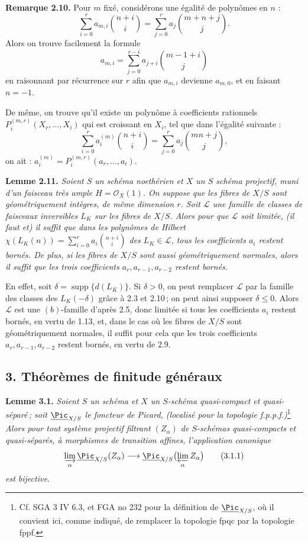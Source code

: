 \textbf{Remarque 2.10.} Pour \(m\) fixé, considérons une égalité de polynômes en \(n\) :
\[
\sum_{i=0}^{r}a_{m,i}\binom{n+i}{i}
=
\sum_{j=0}^{r}a_j\binom{m+n+j}{j}.
\]
Alors on trouve facilement la formule
\[
a_{m,i}=\sum_{j=0}^{r-i}a_{j+i}\binom{m-1+i}{j}
\]
en raisonnant par récurrence sur \(r\) afin que \(a_{m,i}\) devienne \(a_{m,0}\), et en faisant \(n=-1\).

De même, on trouve qu'il existe un polynôme à coefficients rationnels \(P_i^{(m,r)}(X_r,\ldots,X_i)\) qui est croissant en \(X_i\), tel que dans l'égalité suivante :
\[
\sum_{i=0}^{r}a_i^{(m)}\binom{n+i}{i}
=
\sum_{j=0}^{r}a_j\binom{mn+j}{j},
\]
on ait : \(a_i^{(m)}=P_i^{(m,r)}(a_r,\ldots,a_i)\).

\textbf{Lemme 2.11.} \emph{Soient \(S\) un schéma noethérien et \(X\) un \(S\) schéma projectif, muni d'un faisceau très ample \(H=\mathcal O_X(1)\). On suppose que les fibres de \(X/S\) sont géométriquement intègres, de même dimension \(r\). Soit \(\mathcal L\) une famille de classes de faisceaux inversibles \(L_K\) sur les fibres de \(X/S\). Alors pour que \(\mathcal L\) soit limitée, (il faut et) il suffit que dans les polynômes de Hilbert \(\chi(L_K(n))=\sum_{i=0}^{r}a_i\binom{n+i}{i}\) des \(L_K\in\mathcal L\), tous les coefficients \(a_i\) restent bornés. De plus, si les fibres de \(X/S\) sont aussi géométriquement normales, alors il suffit que les trois coefficients \(a_r,a_{r-1},a_{r-2}\) restent bornés.}

En effet, soit \(\delta=\operatorname{supp}\{d(L_K)\}\). Si \(\delta>0\), on peut remplacer \(\mathcal L\) par la famille des classes des \(L_K(-\delta)\) grâce à 2.3 et 2.10\,; on peut ainsi supposer \(\delta\le0\). Alors \(\mathcal L\) est une \((b)\)-famille d'après 2.5, donc limitée si tous les coefficients \(a_i\) restent bornés, en vertu de 1.13, et, dans le cas où les fibres de \(X/S\) sont géométriquement normales, il suffit pour cela que les trois coefficients \(a_r,a_{r-1},a_{r-2}\) restent bornés, en vertu de 2.9.

\subsection*{3. Théorèmes de finitude généraux}
\textbf{Lemme 3.1.} \emph{Soient \(S\) un sch\'ema et \(X\) un \(S\)-sch\'ema quasi-compact et quasi-s\'epar\'e\,; soit \(\underline{\Pic}_{X/S}\) le foncteur de Picard, (localis\'e pour la topologie f.p.p.f.)}\footnote{Cf. SGA 3 IV 6.3, et FGA no 232 pour la d\'efinition de \(\underline{\Pic}_{X/S}\), o\`u il convient ici, comme indiqu\'e, de remplacer la topologie fpqc par la topologie fppf.}
\emph{Alors pour tout syst\`eme projectif filtrant \((Z_\alpha)\) de \(S\)-sch\'emas quasi-compacts et quasi-s\'epar\'es, \`a morphismes de transition affines, l'application canonique}
\[
\varinjlim_\alpha \underline{\Pic}_{X/S}(Z_\alpha)\longrightarrow
\underline{\Pic}_{X/S}\bigl(\varprojlim_\alpha Z_\alpha\bigr)
\tag{3.1.1}
\]
\emph{est bijective.}

